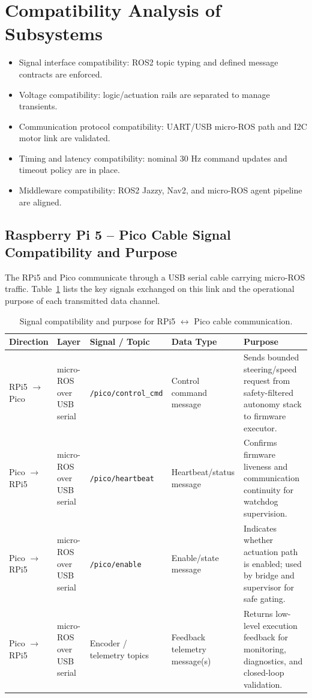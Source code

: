\documentclass[12pt,a4paper]{report}
\begin{document}
\section{Compatibility Analysis of Subsystems}
\begin{itemize}
    \item Signal interface compatibility: ROS2 topic typing and defined message contracts are enforced.
    \item Voltage compatibility: logic/actuation rails are separated to manage transients.
    \item Communication protocol compatibility: UART/USB micro-ROS path and I2C motor link are validated.
    \item Timing and latency compatibility: nominal 30 Hz command updates and timeout policy are in place.
    \item Middleware compatibility: ROS2 Jazzy, Nav2, and micro-ROS agent pipeline are aligned.
\end{itemize}

\subsection{Raspberry Pi 5 -- Pico Cable Signal Compatibility and Purpose}
The RPi5 and Pico communicate through a USB serial cable carrying micro-ROS traffic. Table~\ref{tab:rpi5_pico_signals} lists the key signals exchanged on this link and the operational purpose of each transmitted data channel.

\begin{table}[H]
\centering
\caption{Signal compatibility and purpose for RPi5 $\leftrightarrow$ Pico cable communication.}
\label{tab:rpi5_pico_signals}
\begin{tabularx}{\textwidth}{|p{2.2cm}|p{2.2cm}|p{3.1cm}|p{2.8cm}|X|}
\hline
\textbf{Direction} & \textbf{Layer} & \textbf{Signal / Topic} & \textbf{Data Type} & \textbf{Purpose} \\
\hline
RPi5 $\rightarrow$ Pico & micro-ROS over USB serial & \texttt{/pico/control\_cmd} & Control command message & Sends bounded steering/speed request from safety-filtered autonomy stack to firmware executor. \\
\hline
Pico $\rightarrow$ RPi5 & micro-ROS over USB serial & \texttt{/pico/heartbeat} & Heartbeat/status message & Confirms firmware liveness and communication continuity for watchdog supervision. \\
\hline
Pico $\rightarrow$ RPi5 & micro-ROS over USB serial & \texttt{/pico/enable} & Enable/state message & Indicates whether actuation path is enabled; used by bridge and supervisor for safe gating. \\
\hline
Pico $\rightarrow$ RPi5 & micro-ROS over USB serial & Encoder / telemetry topics & Feedback telemetry message(s) & Returns low-level execution feedback for monitoring, diagnostics, and closed-loop validation. \\
\hline
\end{tabularx}
\end{table}
\end{document}
